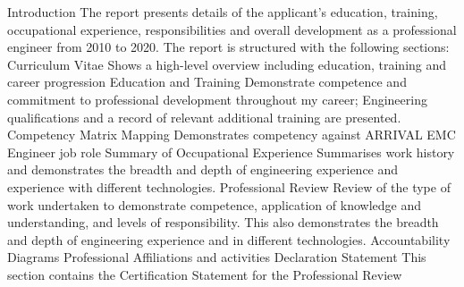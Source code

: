 Introduction
The report presents details of the applicant's education, training, occupational experience, responsibilities and overall development as a professional engineer from 2010 to 2020.
The report is structured with the following sections:            
Curriculum Vitae
Shows a high-level overview including education, training and career progression
Education and Training
Demonstrate competence and commitment to professional development throughout my career; Engineering qualifications and a record of relevant additional training are presented.
Competency Matrix Mapping
Demonstrates competency against ARRIVAL EMC Engineer job role
Summary of Occupational Experience
Summarises work history and demonstrates the breadth and depth of engineering experience and experience with different technologies.
Professional Review
Review of the type of work undertaken to demonstrate competence, application of knowledge and understanding, and levels of responsibility. This also demonstrates the breadth and depth of engineering experience and in different technologies.
Accountability Diagrams
Professional Affiliations and activities
Declaration Statement
This section contains the Certification Statement for the Professional Review
